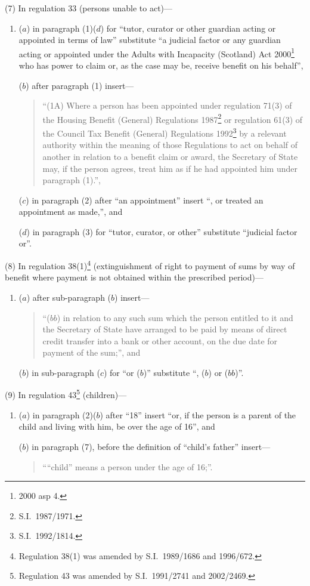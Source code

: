 \documentclass[12pt,a4paper]{article}
\begin{document}
(7) In regulation 33 (persons unable to act)—
\begin{enumerate}\item[]
($a$) in paragraph (1)($d$)  for “tutor, curator or other guardian acting or appointed in terms of law” substitute “a judicial factor or any guardian acting or appointed under the Adults with Incapacity (Scotland) Act 2000\footnote{2000 asp 4.} who has power to claim or, as the case may be, receive benefit on his behalf”,

($b$) after paragraph (1) insert—
\begin{quotation}
“(1A) Where a person has been appointed under regulation 71(3) of the Housing Benefit (General) Regulations 1987\footnote{S.I.\ 1987/1971.} or regulation 61(3) of the Council Tax Benefit (General) Regulations 1992\footnote{S.I.\ 1992/1814.} by a relevant authority within the meaning of those Regulations to act on behalf of another in relation to a benefit claim or award, the Secretary of State may, if the person agrees, treat him as if he had appointed him under paragraph (1).”,
\end{quotation}

($c$) in paragraph (2) after “an appointment” insert “, or treated an appointment as made,”, and

($d$) in paragraph (3) for “tutor, curator, or other” substitute “judicial factor or”.
\end{enumerate}

(8) In regulation 38(1)\footnote{Regulation 38(1) was amended by S.I.\ 1989/1686 and 1996/672.} (extinguishment of right to payment of sums by way of benefit where payment is not obtained within the prescribed period)—
\begin{enumerate}\item[]
($a$) after sub-paragraph ($b$)  insert—
\begin{quotation}
“($bb$) in relation to any such sum which the person entitled to it and the Secretary of State have arranged to be paid by means of direct credit transfer into a bank or other account, on the due date for payment of the sum;”, and
\end{quotation}

($b$) in sub-paragraph ($c$)  for “or ($b$)” substitute “, ($b$)  or ($bb$)”.
\end{enumerate}

(9) In regulation 43\footnote{Regulation 43 was amended by S.I.\ 1991/2741 and 2002/2469.} (children)—
\begin{enumerate}\item[]
($a$) in paragraph (2)($b$)  after “18” insert “or, if the person is a parent of the child and living with him, be over the age of 16”, and

($b$) in paragraph (7), before the definition of “child’s father” insert—
\begin{quotation}
““child” means a person under the age of 16;”.
\end{quotation}
\end{enumerate}
\end{document}
